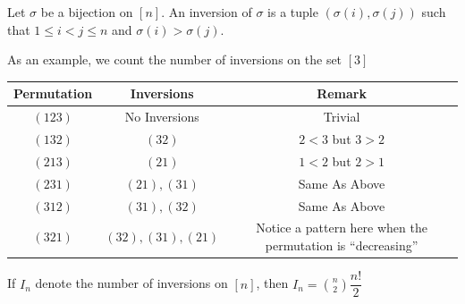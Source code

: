 \begin{definition}[Inversion]
Let $\sigma$ be a bijection on $[n]$. An inversion of $\sigma$ is a tuple $(\sigma(i),\sigma(j))$ such that $1\leq i<j\leq n$ and $\sigma(i)>\sigma(j)$.
\end{definition}
As an example, we count the number of inversions on the set $[3]$
\begin{center}
\begin{tabular}{|c|c|c|}
\hline
\textbf{Permutation} & \textbf{Inversions} & \textbf{Remark} \\
\hline
$(123)$ & No Inversions & Trivial \\
\hline
$(132)$ & $(32)$ & $2<3$ but $3>2$ \\
\hline 
$(213)$ & $(21)$ & $1<2$ but $2>1$ \\
\hline
$(231)$ & $(21),(31)$ & Same As Above \\
\hline
$(312)$ & $(31),(32)$ & Same As Above \\
\hline
$(321)$ & $(32),(31),(21)$ & Notice a pattern here when the permutation is ``decreasing''\\\hline
\end{tabular}
\end{center}
\begin{claim}
    If $I_n$ denote the number of inversions on $[n]$, then $I_n = \binom{n}{2}\dfrac{n!}{2}$
\end{claim}

